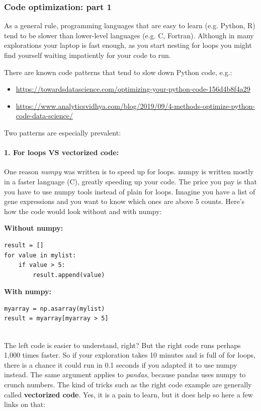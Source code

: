 \documentclass[12pt,a4paper,notitlepage,onecolumn]{article}
\begin{document}
\subsubsection{Code optimization: part 1}
As a general rule, programming languages that are easy to learn (e.g. Python, R) tend to be slower than lower-level languages (e.g. C, Fortran). Although in many explorations your laptop is fast enough, as you start nesting for loops you might find yourself waiting impatiently for your code to run. 

There are known code patterns that tend to slow down Python code, e.g.:

{\scriptsize
\begin{itemize}
\item \url{https://towardsdatascience.com/optimizing-your-python-code-156d4b8f4a29}
\item \url{https://www.analyticsvidhya.com/blog/2019/09/4-methods-optimize-python-code-data-science/}
\end{itemize}
}

\noindent
Two patterns are especially prevalent:

\paragraph{1. For loops VS vectorized code:} One reason \textit{numpy} was written is to speed up for loops. numpy is written mostly in a faster language (C), greatly speeding up your code. The price you pay is that you have to use numpy tools instead of plain for loops. Imagine you have a list of gene expressions and you want to know which ones are above 5 counts. Here's how the code would look without and with numpy:

\begin{multicols}{2}[]
\noindent
\textbf{Without numpy:}

\begin{verbatim}
result = []
for value in mylist:
    if value > 5:
        result.append(value)
\end{verbatim}

\noindent
\textbf{With numpy:}

\begin{verbatim}
myarray = np.asarray(mylist)
result = myarray[myarray > 5]


\end{verbatim}
\end{multicols}

The left code is easier to understand, right? But the right code runs perhaps 1,000 times faster. So if your exploration takes 10 minutes and is full of for loops, there is a chance it could run in 0.1 seconds if you adapted it to use numpy instead. The same argument applies to \textit{pandas}, because pandas uses numpy to crunch numbers. The kind of tricks such as the right code example are generally called \textbf{vectorized code}. Yes, it is a pain to learn, but it does help so here a few links on that:
\end{document}
